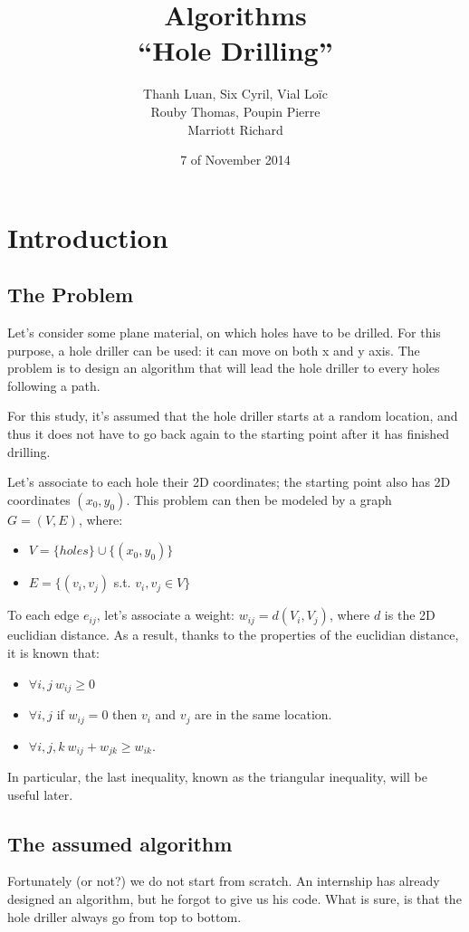 \documentclass[11pt]{article}
\title{Algorithms \\
	\textbf{``Hole Drilling''}}
\author{Thanh Luan, Six Cyril, Vial Loïc \\
			Rouby Thomas, Poupin Pierre\\
			Marriott Richard}
\date{7\up{th} of November 2014}
\begin{document}
\maketitle
\tableofcontents

\section{Introduction}
\subsection{The Problem}
Let's consider some plane material, on which holes have to be drilled. For this
purpose, a hole driller can be used: it can move on both x and y axis. The
problem is to design an algorithm that will lead the hole driller to every holes
following a path.

For this study, it's assumed that the hole driller starts at a random location,
and thus it does not have to go back again to the starting point after it has
finished drilling.

Let's associate to each hole their 2D coordinates; the starting point also
has 2D coordinates $(x_0, y_0)$.
This problem can then be modeled by a graph $G = (V, E)$, where:
\begin{itemize}
	\item $V = \{holes\} \cup \{(x_0, y_0)\}$
	\item $E = \{(v_i, v_j)$ s.t. $v_i, v_j \in V\}$
\end{itemize}

To each edge $e_{ij}$, let's associate a weight: $w_{ij} = d(V_i, V_j)$, where
$d$ is the 2D euclidian distance. As a result, thanks to the properties of the
euclidian distance, it is known that:
\begin{itemize}
	\item $\forall i, j~w_{ij} \geq 0$
	\item $\forall i, j$ if $w_{ij} = 0$ then $v_i$ and $v_j$ are in the same
		location.
	\item $\forall i, j, k~w_{ij} + w_{jk} \geq w_{ik}$.
\end{itemize}

In particular, the last inequality, known as the triangular inequality, will be
useful later.

\subsection{The assumed algorithm}
Fortunately (or not?) we do not start from scratch. An internship has already
designed an algorithm, but he forgot to give us his code. What is sure, is that
the hole driller always go from top to bottom.
\end{document}

